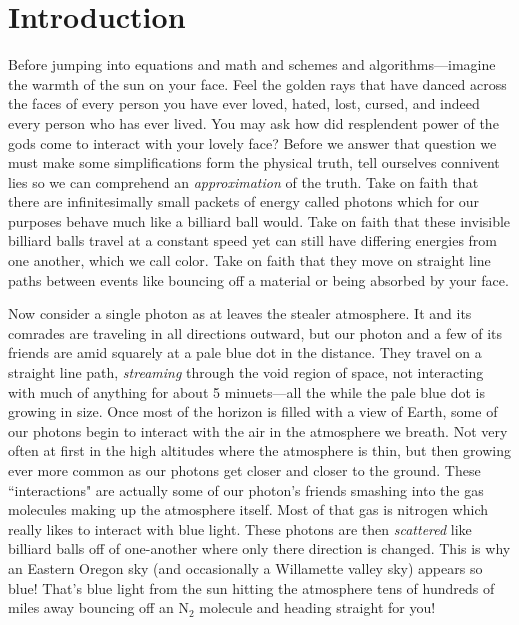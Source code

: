 
\chapter{Introduction}
\label{chap:intro}



Before jumping into equations and math and schemes and algorithms---imagine the warmth of the sun on your face.
Feel the golden rays that have danced across the faces of every person you have ever loved, hated, lost, cursed, and indeed every person who has ever lived.
You may ask how did resplendent power of the gods come to interact with your lovely face?
Before we answer that question we must make some simplifications form the physical truth, tell ourselves connivent lies so we can comprehend an \textit{approximation} of the truth.
Take on faith that there are infinitesimally small packets of energy called photons which for our purposes behave much like a billiard ball would.
Take on faith that these invisible billiard balls travel at a constant speed yet can still have differing energies from one another, which we call color.
Take on faith that they move on straight line paths between events like bouncing off a material or being absorbed by your face.

Now consider a single photon as at leaves the stealer atmosphere.
It and its comrades are traveling in all directions outward, but our photon and a few of its friends are amid squarely at a pale blue dot in the distance.
They travel on a straight line path, \textit{streaming} through the void region of space, not interacting with much of anything for about 5 minuets---all the while the pale blue dot is growing in size.
Once most of the horizon is filled with a view of Earth, some of our photons begin to interact with the air in the atmosphere we breath.
Not very often at first in the high altitudes where the atmosphere is thin, but then growing ever more common as our photons get closer and closer to the ground.
These ``interactions" are actually some of our photon's friends smashing into the gas molecules making up the atmosphere itself.
Most of that gas is nitrogen which really likes to interact with blue light.
These photons are then \textit{scattered} like billiard balls off of one-another where only there direction is changed.
This is why an Eastern Oregon sky (and occasionally a Willamette valley sky) appears so blue!
That's blue light from the sun hitting the atmosphere tens of hundreds of miles away bouncing off an N$_2$ molecule and heading straight for you!

